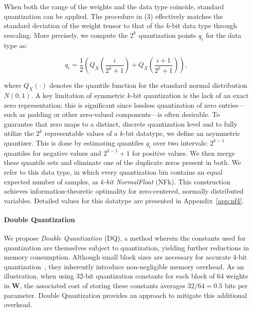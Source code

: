 When both the range of the weights and the data type coincide, standard quantization can be applied. The procedure in (3) effectively matches the standard deviation of the weight tensor to that of the $k$-bit data type through rescaling. More precisely, we compute the $2^k$ quantization points $q_i$ for the data type as:

\begin{equation}
q_i  = \frac{1}{2}\left( Q_X\left(\frac{i}{2^k+1}\right) + Q_X\left(\frac{i+1}{2^k+1}\right)\right),
\end{equation}

where $Q_X(\cdot)$ denotes the quantile function for the standard normal distribution $N(0,1)$. A key limitation of symmetric $k$-bit quantization is the lack of an exact zero representation; this is significant since lossless quantization of zero entries—such as padding or other zero-valued components—is often desirable. To guarantee that zero maps to a distinct, discrete quantization level and to fully utilize the $2^k$ representable values of a $k$-bit datatype, we define an asymmetric quantizer. This is done by estimating quantiles $q_i$ over two intervals: $2^{k-1}$ quantiles for negative values and $2^{k-1}+1$ for positive values. We then merge these quantile sets and eliminate one of the duplicate zeros present in both. We refer to this data type, in which every quantization bin contains an equal expected number of samples, as \emph{k-bit NormalFloat} (NFk). This construction achieves information-theoretic optimality for zero-centered, normally distributed variables. Detailed values for this datatype are presented in Appendix~\ref{app:nf4}.

\paragraph{Double Quantization{}} 
We propose \emph{Double Quantization} (DQ), a method wherein the constants used for quantization are themselves subject to quantization, yielding further reductions in memory consumption. Although small block sizes are necessary for accurate 4-bit quantization~\citep{dettmers2022case}, they inherently introduce non-negligible memory overhead. As an illustration, when using 32-bit quantization constants for each block of 64 weights in $\mathbf{W}$, the associated cost of storing these constants averages $32/64 = 0.5$ bits per parameter. Double Quantization provides an approach to mitigate this additional overhead.

